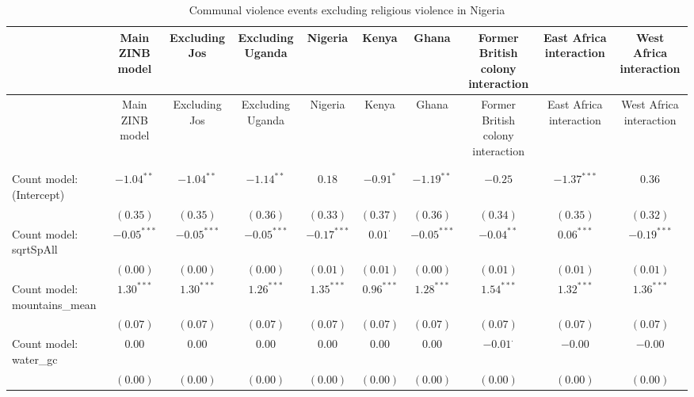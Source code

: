 
\begin{center}
\begin{longtable}{l c c c c c c c c c}
\toprule
 & Main ZINB model & Excluding Jos & Excluding Uganda & Nigeria & Kenya & Ghana & Former British colony interaction & East Africa
	    interaction & West Africa interaction \\
\midrule
\endfirsthead
\toprule
 & Main ZINB model & Excluding Jos & Excluding Uganda & Nigeria & Kenya & Ghana & Former British colony interaction & East Africa
	    interaction & West Africa interaction \\
\midrule
\endhead
\bottomrule
\endfoot
\bottomrule
\multicolumn{10}{l}{\scriptsize{$^{***}p<0.001$; $^{**}p<0.01$; $^{*}p<0.05$; $^{\cdot}p<0.1$}}\\
\caption{Communal violence events excluding religious violence
	       in Nigeria}
\label{zorg3nigreldif}
\endlastfoot \\
Count model: (Intercept)       & $-1.04^{**}$   & $-1.04^{**}$   & $-1.14^{**}$   & $0.18$          & $-0.91^{*}$    & $-1.19^{**}$    & $-0.25$         & $-1.37^{***}$   & $0.36$         \\
                               & $(0.35)$       & $(0.35)$       & $(0.36)$       & $(0.33)$        & $(0.37)$       & $(0.36)$        & $(0.34)$        & $(0.35)$        & $(0.32)$       \\
Count model: sqrtSpAll         & $-0.05^{***}$  & $-0.05^{***}$  & $-0.05^{***}$  & $-0.17^{***}$   & $0.01^{\cdot}$ & $-0.05^{***}$   & $-0.04^{**}$    & $0.06^{***}$    & $-0.19^{***}$  \\
                               & $(0.00)$       & $(0.00)$       & $(0.00)$       & $(0.01)$        & $(0.01)$       & $(0.00)$        & $(0.01)$        & $(0.01)$        & $(0.01)$       \\
Count model: mountains\_mean   & $1.30^{***}$   & $1.30^{***}$   & $1.26^{***}$   & $1.35^{***}$    & $0.96^{***}$   & $1.28^{***}$    & $1.54^{***}$    & $1.32^{***}$    & $1.36^{***}$   \\
                               & $(0.07)$       & $(0.07)$       & $(0.07)$       & $(0.07)$        & $(0.07)$       & $(0.07)$        & $(0.07)$        & $(0.07)$        & $(0.07)$       \\
Count model: water\_gc         & $0.00$         & $0.00$         & $0.00$         & $0.00$          & $0.00$         & $0.00$          & $-0.01^{\cdot}$ & $-0.00$         & $-0.00$        \\
                               & $(0.00)$       & $(0.00)$       & $(0.00)$       & $(0.00)$        & $(0.00)$       & $(0.00)$        & $(0.00)$        & $(0.00)$        & $(0.00)$       \\

\end{longtable}
\end{center}
